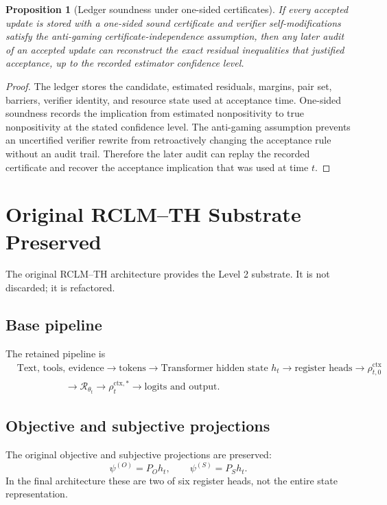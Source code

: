 \documentclass[11pt,a4paper]{article}
\newtheorem{proposition}[theorem]{Proposition}
\newcommand{\Rcal}{\mathcal R}
\newcommand{\ctx}{\mathrm{ctx}}
\begin{document}
\begin{proposition}[Ledger soundness under one-sided certificates]
If every accepted update is stored with a one-sided sound certificate and verifier self-modifications satisfy the anti-gaming certificate-independence assumption, then any later audit of an accepted update can reconstruct the exact residual inequalities that justified acceptance, up to the recorded estimator confidence level.
\end{proposition}

\begin{proof}
The ledger stores the candidate, estimated residuals, margins, pair set, barriers, verifier identity, and resource state used at acceptance time. One-sided soundness records the implication from estimated nonpositivity to true nonpositivity at the stated confidence level. The anti-gaming assumption prevents an uncertified verifier rewrite from retroactively changing the acceptance rule without an audit trail. Therefore the later audit can replay the recorded certificate and recover the acceptance implication that was used at time \(t\).
\end{proof}

\section{Original RCLM--TH Substrate Preserved}

The original RCLM--TH architecture provides the Level 2 substrate. It is not discarded; it is refactored.

\subsection{Base pipeline}

The retained pipeline is
\[
\begin{aligned}
&\text{Text, tools, evidence}\to\text{tokens}\to\text{Transformer hidden state }h_t\to\text{register heads}\to\rho_{t,0}^{\ctx}\\
&\hspace{5em}\to\Rcal_{\theta_t}\to\rho_t^{\ctx,*}\to\text{logits and output}.
\end{aligned}
\]

\subsection{Objective and subjective projections}

The original objective and subjective projections are preserved:
\[
\psi^{(O)}=P_Oh_t,
\qquad
\psi^{(S)}=P_Sh_t.
\]
In the final architecture these are two of six register heads, not the entire state representation.
\end{document}
